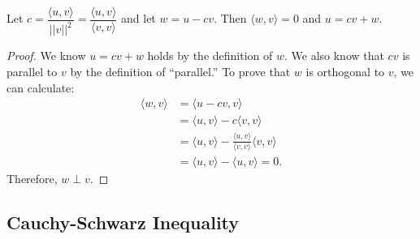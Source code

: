 \documentclass[11pt]{article}
\begin{document}
    Let \(c = \dfrac{\langle u,v \rangle}{||v||^2} = \dfrac{\langle u,v \rangle}{\langle v,v \rangle}\) and let \(w = u - cv\). Then \(\langle w,v \rangle = 0\) and \(u = cv + w\). 

    \begin{proof}
        We know \(u = cv + w\) holds by the definition of $w$. We also know that $cv$ is parallel to $v$ by the definition of ``parallel.'' To prove that $w$ is orthogonal to $v$, we can calculate:
        \begin{align*}
            \langle w,v \rangle &= \langle u-cv, v \rangle \\
                                &= \langle u,v \rangle - c \langle v,v \rangle \\
                                &= \langle u,v \rangle - \frac{\langle u,v \rangle}{\langle v,v \rangle} \langle v,v \rangle \\
                                &= \langle u,v \rangle - \langle u,v \rangle = 0.
        \end{align*}
        Therefore, \(w \perp v.\)
    \end{proof}

    \subsection{Cauchy-Schwarz Inequality}
\end{document}
